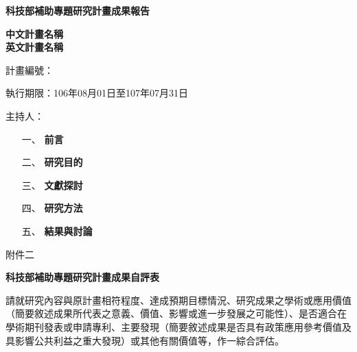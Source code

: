\documentclass[12pt]{article}
\begin{document}
\newpage
\begin{center}
{\bf \Large 科技部補助專題研究計畫成果報告}
\vspace*{1cm}


{\bf \Large  中文計畫名稱  \\ 英文計畫名稱}

\vspace*{1cm}

{\large 計畫編號：  }

\vspace*{0.3cm}
{ 執行期限：106年08月01日至107年07月31日}

\vspace*{0.3cm}
{\large 主持人： }

\end{center}
\begin{enumerate}
 \item [一、] {\bf 前言}

  
 \item [二、]{\bf 研究目的}

 \item [三、]{\bf 文獻探討}

 \item [四、]{\bf 研究方法}

\item[五、] {\bf 結果與討論}
\end{enumerate}

\newpage
\vspace*{-1cm}
\noindent 附件二
\vspace*{1cm}
\begin{center}
{\bf \Large 科技部補助專題研究計畫成果自評表}
\end{center}

\vspace*{1cm}

請就研究內容與原計畫相符程度、達成預期目標情況、研究成果之學術或應用價值（簡要敘述成果所代表之意義、價值、影響或進一步發展之可能性）、是否適合在學術期刊發表或申請專利、主要發現（簡要敘述成果是否具有政策應用參考價值及具影響公共利益之重大發現）或其他有關價值等，作一綜合評估。
\end{document}
